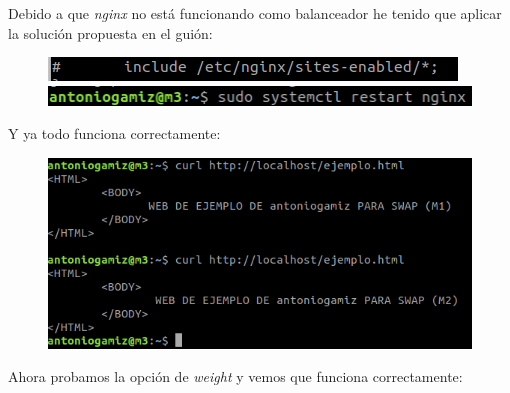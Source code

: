 \documentclass[12pt]{article}
\begin{document}
Debido a que \textit{nginx} no está funcionando como balanceador he tenido que aplicar la solución propuesta en el guión:

\begin{figure}[H]
\center
\includegraphics[scale=0.5]{9.png}
\includegraphics[scale=0.5]{10.png}
\end{figure}

Y ya todo funciona correctamente:

\begin{figure}[H]
\center
\includegraphics[scale=0.5]{11.png}
\end{figure}

Ahora probamos la opción de \textit{weight} y vemos que funciona correctamente:
\end{document}
